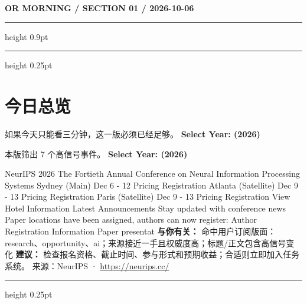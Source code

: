 \documentclass[10.5pt]{ctexart}
\begin{document}
{\small\bfseries OR MORNING / SECTION 01 / 2026-10-06}
\vspace{2mm}
\hrule height 0.9pt
\vspace{1.5mm}
\hrule height 0.25pt
\vspace{4mm}
\section*{今日总览}
{\color{ormuted} 如果今天只能看三分钟，这一版必须已经足够。}
\vspace{2mm}
{\fontsize{25}{29}\selectfont\bfseries Select Year: (2026)}\par
\vspace{2mm}
{\large 本版筛出 7 个高信号事件。}
\vspace{3mm}
{\Large\bfseries Select Year: (2026)}\par
NeurIPS 2026 The Fortieth Annual Conference on Neural Information Processing Systems Sydney (Main) Dec 6 - 12 Pricing Registration Atlanta (Satellite) Dec 9 - 13 Pricing Registration Paris (Satellite) Dec 9 - 13 Pricing Registration View Hotel Information Latest Announcements Stay updated with conference news Paper locations have been assigned, authors can now register: Author Registration Information Paper presentat
\textbf{与你有关：} 命中用户订阅版面：research、opportunity、ai；来源接近一手且权威度高；标题/正文包含高信号变化
\textbf{建议：} 检查报名资格、截止时间、参与形式和预期收益；合适则立即加入任务系统。
{\footnotesize\color{ormuted} 来源：NeurIPS · \url{https://neurips.cc/}}
\vspace{3mm}
\hrule height 0.25pt
\vspace{3mm}
\end{document}
